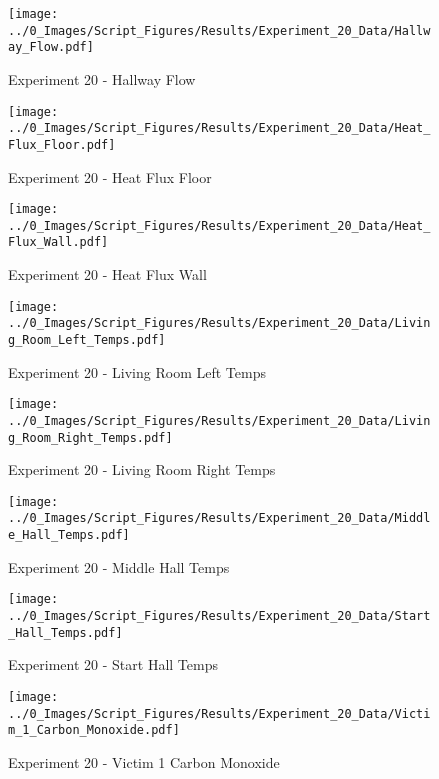 	\begin{figure}[H]
		\centering
		\texttt{[image: ../0\_Images/Script\_Figures/Results/Experiment\_20\_Data/Hallway\_Flow.pdf]}
		\caption[]{Experiment 20 - Hallway Flow}
	\end{figure}
 
	\clearpage

	\begin{figure}[H]
		\centering
		\texttt{[image: ../0\_Images/Script\_Figures/Results/Experiment\_20\_Data/Heat\_Flux\_Floor.pdf]}
		\caption[]{Experiment 20 - Heat Flux Floor}
	\end{figure}
 

	\begin{figure}[H]
		\centering
		\texttt{[image: ../0\_Images/Script\_Figures/Results/Experiment\_20\_Data/Heat\_Flux\_Wall.pdf]}
		\caption[]{Experiment 20 - Heat Flux Wall}
	\end{figure}
 
	\clearpage

	\begin{figure}[H]
		\centering
		\texttt{[image: ../0\_Images/Script\_Figures/Results/Experiment\_20\_Data/Living\_Room\_Left\_Temps.pdf]}
		\caption[]{Experiment 20 - Living Room Left Temps}
	\end{figure}
 

	\begin{figure}[H]
		\centering
		\texttt{[image: ../0\_Images/Script\_Figures/Results/Experiment\_20\_Data/Living\_Room\_Right\_Temps.pdf]}
		\caption[]{Experiment 20 - Living Room Right Temps}
	\end{figure}
 
	\clearpage

	\begin{figure}[H]
		\centering
		\texttt{[image: ../0\_Images/Script\_Figures/Results/Experiment\_20\_Data/Middle\_Hall\_Temps.pdf]}
		\caption[]{Experiment 20 - Middle Hall Temps}
	\end{figure}
 

	\begin{figure}[H]
		\centering
		\texttt{[image: ../0\_Images/Script\_Figures/Results/Experiment\_20\_Data/Start\_Hall\_Temps.pdf]}
		\caption[]{Experiment 20 - Start Hall Temps}
	\end{figure}
 
	\clearpage

	\begin{figure}[H]
		\centering
		\texttt{[image: ../0\_Images/Script\_Figures/Results/Experiment\_20\_Data/Victim\_1\_Carbon\_Monoxide.pdf]}
		\caption[]{Experiment 20 - Victim 1 Carbon Monoxide}
	\end{figure}
 

